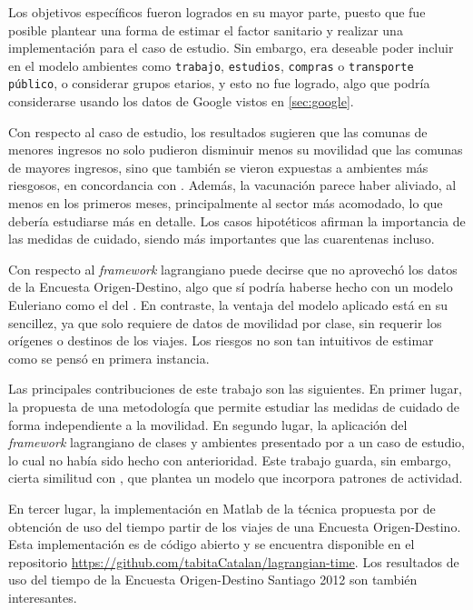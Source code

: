 \begin{conclusion} \label{chap:conclu}


Los objetivos específicos fueron logrados en su mayor parte, puesto que fue posible plantear una forma de estimar el factor sanitario y realizar una implementación para el caso de estudio. Sin embargo, era deseable poder incluir en el modelo ambientes como \texttt{trabajo}, \texttt{estudios}, \texttt{compras} o \texttt{transporte público}, o considerar grupos etarios, y esto no fue logrado, algo que podría considerarse usando los datos de Google vistos en \ref{sec:google}.

Con respecto al caso de estudio, los resultados sugieren que las comunas de menores ingresos no solo pudieron disminuir menos su movilidad que las comunas de mayores ingresos, sino que también se vieron expuestas a ambientes más riesgosos, en concordancia con \cite{Chang2021}. Además, la vacunación parece haber aliviado, al menos en los primeros meses, principalmente al sector más acomodado, lo que debería estudiarse más en detalle. Los casos hipotéticos afirman la importancia de las medidas de cuidado, siendo más importantes que las cuarentenas incluso.

Con respecto al \textit{framework} lagrangiano puede decirse que no aprovechó los datos de la Encuesta Origen-Destino, algo que sí podría haberse hecho con un modelo Euleriano  como el del \cite{Lai2020}. En contraste, la ventaja del modelo aplicado está en su sencillez, ya que solo requiere de datos de movilidad por clase, sin requerir los orígenes o destinos de los viajes. Los riesgos no son tan intuitivos de estimar como se pensó en primera instancia.

Las principales contribuciones de este trabajo son las siguientes. En primer lugar, la propuesta de una metodología que permite estudiar las medidas de cuidado de forma independiente a la movilidad. En segundo lugar, la aplicación del \textit{framework} lagrangiano de clases y ambientes presentado por \cite{Bichara2018} a un caso de estudio, lo cual no había sido hecho con anterioridad. Este trabajo guarda, sin embargo, cierta similitud con \cite{Shikhmurzaev}, que plantea un modelo que incorpora patrones de actividad.

En tercer lugar, la implementación en Matlab de la técnica propuesta por \cite{Munizaga2011} de obtención de uso del tiempo partir de los viajes de una Encuesta Origen-Destino. Esta implementación es de código abierto y se encuentra disponible en el repositorio \url{https://github.com/tabitaCatalan/lagrangian-time}. Los resultados de uso del tiempo de la Encuesta Origen-Destino Santiago 2012 son también interesantes.


\end{conclusion}
